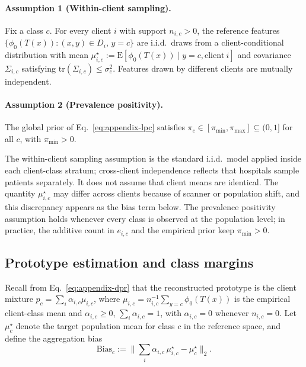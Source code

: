 \documentclass[letterpaper]{article}
\theoremstyle{definition}
\theoremstyle{plain}
\begin{document}
\paragraph{Assumption 1 (Within-client sampling).}
\label{as:sampling}
Fix a class $c$. For every client $i$ with support $n_{i,c}>0$, the reference features $\{\phi_0(T(x)):(x,y)\in D_{i},\,y=c\}$ are i.i.d.\ draws from a client-conditional distribution with mean $\mu_{i,c}^{\star}:=\mathrm{E}[\phi_0(T(x))\mid y=c,\mathrm{client}\ i]$ and covariance $\Sigma_{i,c}$ satisfying $\mathrm{tr}(\Sigma_{i,c})\le\sigma_c^{2}$. Features drawn by different clients are mutually independent.

\paragraph{Assumption 2 (Prevalence positivity).}
\label{as:prevalence}
The global prior of Eq.~\ref{eq:appendix-lpc} satisfies $\pi_c\in[\pi_{\min},\pi_{\max}]\subseteq(0,1]$ for all $c$, with $\pi_{\min}>0$.

The within-client sampling assumption is the standard i.i.d.\ model applied inside each client-class stratum; cross-client independence reflects that hospitals sample patients separately. It does not assume that client means are identical. The quantity \(\mu_{i,c}^{\star}\) may differ across clients because of scanner or population shift, and this discrepancy appears as the bias term below. The prevalence positivity assumption holds whenever every class is observed at the population level; in practice, the additive count in \(e_{i,c}\) and the empirical prior keep \(\pi_{\min}>0\).

\subsection{Prototype estimation and class margins}
\label{app:theory-dpr}

Recall from Eq.~\ref{eq:appendix-dpr} that the reconstructed prototype is the client mixture $p_c=\sum_{i}\alpha_{i,c}\mu_{i,c}$, where $\mu_{i,c}=n_{i,c}^{-1}\sum_{y=c}\phi_0(T(x))$ is the empirical client-class mean and $\alpha_{i,c}\ge0$, $\sum_i\alpha_{i,c}=1$, with $\alpha_{i,c}=0$ whenever $n_{i,c}=0$. Let $\mu_c^{\star}$ denote the target population mean for class $c$ in the reference space, and define the aggregation bias
\begin{equation}
\mathrm{Bias}_c:=\Big\|\sum_{i}\alpha_{i,c}\,\mu_{i,c}^{\star}-\mu_c^{\star}\Big\|_2 .
\end{equation}
\end{document}
